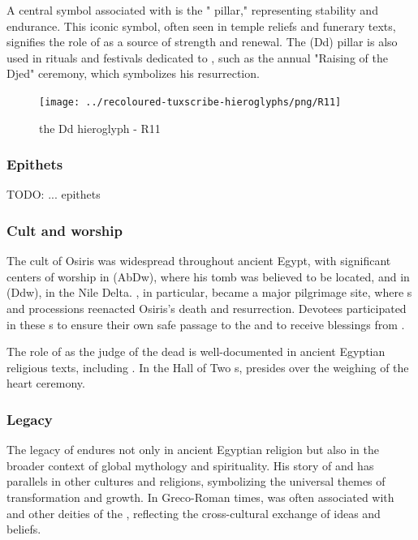 A central symbol associated with  is the " pillar," representing stability and endurance. This iconic symbol, often seen in temple reliefs and funerary texts, signifies the role of  as a source of strength and renewal. The  (Dd) pillar is also used in rituals and festivals dedicated to , such as the annual "Raising of the Djed" ceremony, which symbolizes his resurrection.

\begin{figure} [H]
	\centering
	\texttt{[image: ../recoloured-tuxscribe-hieroglyphs/png/R11]}
	\caption{the Dd hieroglyph - R11}
\end{figure}

\subsubsection*{Epithets}

TODO: ... epithets

\subsubsection*{Cult and worship}

The cult of Osiris was widespread throughout ancient Egypt, with significant centers of worship in  (AbDw), where his tomb was believed to be located, and in  (Ddw), in the Nile Delta. , in particular, became a major pilgrimage site, where s and processions reenacted Osiris's death and resurrection. Devotees participated in these s to ensure their own safe passage to the  and to receive blessings from .

The role of  as the judge of the dead is well-documented in ancient Egyptian religious texts, including . In the Hall of Two s,  presides over the weighing of the heart ceremony.

\subsubsection*{Legacy}

The legacy of  endures not only in ancient Egyptian religion but also in the broader context of global mythology and spirituality. His story of  and  has parallels in other cultures and religions, symbolizing the universal themes of transformation and growth. In Greco-Roman times,  was often associated with  and other deities of the , reflecting the cross-cultural exchange of ideas and beliefs.


